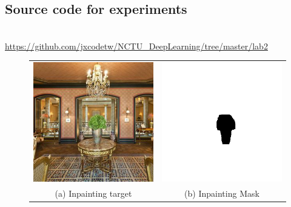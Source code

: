 \documentclass[A4]{article}
\begin{document}
\begin{appendices}
\chapter{Source code for experiments}\\
\url{https://github.com/jxcodetw/NCTU_DeepLearning/tree/master/lab2}
\end{appendices}
\begin{figure}[H]
\begin{tabular}{cc}
\includegraphics[width=80mm]{inpainting-gt.png} & \includegraphics[width=80mm]{inpainting-mask.png} \\
(a) Inpainting target & (b) Inpainting Mask \\[6pt]

\end{tabular}
\end{figure}
\end{document}
